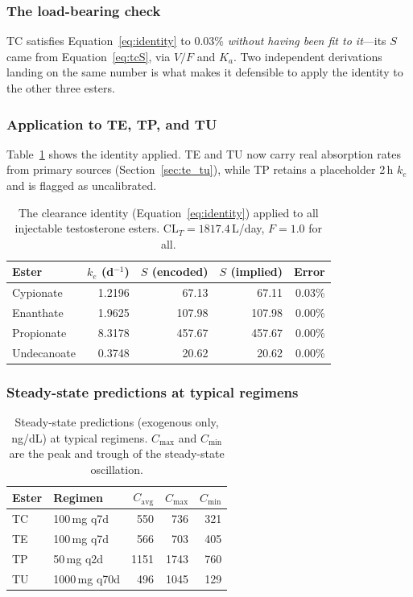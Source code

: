 \documentclass[11pt,a4paper]{article}
\newcommand{\good}[1]{\textcolor{ok}{#1}}
\begin{document}
\subsubsection{The load-bearing check}

TC satisfies Equation~\ref{eq:identity} to 0.03\% \emph{without having
been fit to it}---its $S$ came from Equation~\ref{eq:tcS}, via $V/F$ and
$K_a$. Two independent derivations landing on the same number is what
makes it defensible to apply the identity to the other three esters.

\subsubsection{Application to TE, TP, and TU}

Table~\ref{tab:identity} shows the identity applied. TE and TU now carry
real absorption rates from primary sources (Section~\ref{sec:te_tu}),
while TP retains a placeholder 2\,h $k_e$ and is flagged as uncalibrated.

\begin{table}[h]
\centering
\small
\begin{tabular}{@{}lrrrr@{}}
\toprule
\textbf{Ester} & $k_e$ (d$^{-1}$) & $S$ (encoded) & $S$ (implied) & \textbf{Error} \\
\midrule
Cypionate   & 1.2196 & 67.13  & 67.11  & \good{0.03\%} \\
Enanthate   & 1.9625 & 107.98 & 107.98 & \good{0.00\%} \\
Propionate  & 8.3178 & 457.67 & 457.67 & \good{0.00\%} \\
Undecanoate & 0.3748 & 20.62  & 20.62  & \good{0.00\%} \\
\bottomrule
\end{tabular}
\caption{The clearance identity (Equation~\ref{eq:identity}) applied to
all injectable testosterone esters. $\mathrm{CL}_T = 1817.4$\,L/day,
$F = 1.0$ for all.}
\label{tab:identity}
\end{table}

\subsubsection{Steady-state predictions at typical regimens}

\begin{table}[h]
\centering
\small
\begin{tabular}{@{}llrrr@{}}
\toprule
\textbf{Ester} & \textbf{Regimen} & $C_{\mathrm{avg}}$ & $C_{\max}$ & $C_{\min}$ \\
\midrule
TC & 100\,mg q7d   & 550 & 736 & 321 \\
TE & 100\,mg q7d   & 566 & 703 & 405 \\
TP & 50\,mg q2d    & 1151 & 1743 & 760 \\
TU & 1000\,mg q70d & 496 & 1045 & 129 \\
\bottomrule
\end{tabular}
\caption{Steady-state predictions (exogenous only, ng/dL) at typical
regimens. $C_{\max}$ and $C_{\min}$ are the peak and trough of the
steady-state oscillation.}
\label{tab:steady_state}
\end{table}
\end{document}

